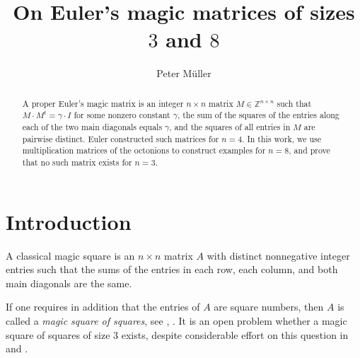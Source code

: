 \documentclass[12pt]{amsart}
\theoremstyle{definition}
\newcommand{\ZZ}{\mathbb Z}
\begin{document}
\baselineskip=17pt
\title[Euler's magic matrices]{On Euler's magic matrices of sizes $3$ and $8$}
\author[P. Müller]{Peter M\"uller}
\address{Institute of Mathematics\\ University of W\"urzburg\\ Germany}
\date{}
\begin{abstract}
  A proper Euler's magic matrix is an integer $n\times n$ matrix
  $M\in\ZZ^{n\times n}$ such that $M\cdot M^t=\gamma\cdot I$ for some
  nonzero constant $\gamma$, the sum of the squares of the entries
  along each of the two main diagonals equals $\gamma$, and the
  squares of all entries in $M$ are pairwise distinct. Euler
  constructed such matrices for $n=4$. In this work, we use
  multiplication matrices of the octonions to construct
  examples for $n=8$, and prove that no such matrix exists for $n=3$.
\end{abstract}
\maketitle
\section{Introduction} A classical magic square is an $n\times n$
matrix $A$ with distinct nonnegative integer entries such that the
sums of the entries in each row, each column, and both main diagonals
are the same.

If one requires in addition that the entries of $A$ are square
numbers, then $A$ is called a \emph{magic square of squares}, see
\cite{boyer}, \cite{robertson}. It is an open problem whether a magic
square of squares of size $3$ exists, despite considerable effort on
this question in \cite{bremner_1} and \cite{bremner_2}.
\end{document}
